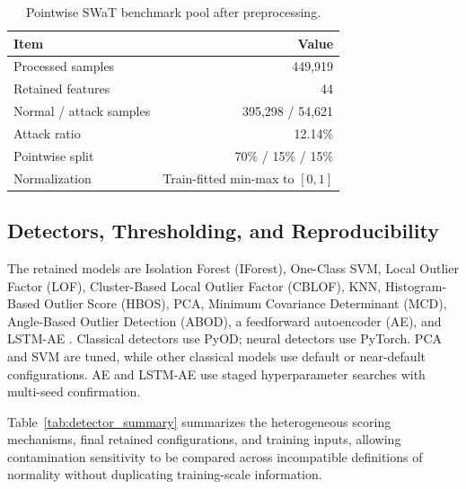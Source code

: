 \documentclass[10pt,conference]{IEEEtran}
\begin{document}
\begin{table}[t]
\caption{Pointwise SWaT benchmark pool after preprocessing.}
\label{tab:dataset_summary}
\centering
\footnotesize
\begin{tabular}{|l|r|}
\hline
\textbf{Item} & \textbf{Value} \\
\hline
Processed samples & 449,919 \\
Retained features & 44 \\
Normal / attack samples & 395,298 / 54,621 \\
Attack ratio & 12.14\% \\
Pointwise split & 70\% / 15\% / 15\% \\
Normalization & Train-fitted min-max to $[0,1]$ \\
\hline
\end{tabular}
\end{table}

\subsection{Detectors, Thresholding, and Reproducibility}

The retained models are Isolation Forest (IForest), One-Class SVM, Local Outlier Factor (LOF), Cluster-Based Local Outlier Factor (CBLOF), KNN, Histogram-Based Outlier Score (HBOS), PCA, Minimum Covariance Determinant (MCD), Angle-Based Outlier Detection (ABOD), a feedforward autoencoder (AE), and LSTM-AE \cite{liu2008iforest,scholkopf2001ocsvm,breunig2000lof,he2003cblof,ramaswamy2000knn,goldstein2012hbos,shyu2003pca,rousseeuw1999mcd,kriegel2008abod,sakurada2014autoencoder,kieu2019recurrent}. Classical detectors use PyOD; neural detectors use PyTorch. PCA and SVM are tuned, while other classical models use default or near-default configurations. AE and LSTM-AE use staged hyperparameter searches with multi-seed confirmation.

Table~\ref{tab:detector_summary} summarizes the heterogeneous scoring mechanisms, final retained configurations, and training inputs, allowing contamination sensitivity to be compared across incompatible definitions of normality without duplicating training-scale information.
\end{document}
